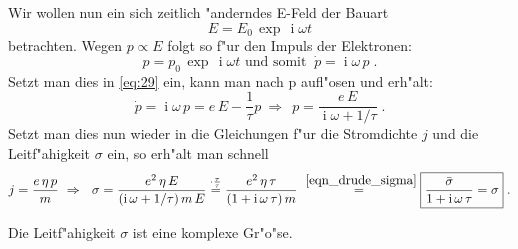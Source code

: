 \documentclass[twoside,a4paper]{book}
\newcommand{\diff}{\ensuremath{\, \mathrm{d}}}
\newcommand{\Folgt}{\ensuremath{~ \Rightarrow ~ ~ }}
\newcommand{\E}{\ensuremath{\operatorname{e}}}
\newcommand{\I}{\ensuremath{\operatorname{i}}}
\newcommand{\abs}[0]{\bigskip \noindent}
\begin{document}
\abs
Wir wollen nun ein sich zeitlich "anderndes E-Feld der Bauart
 $$E = E_0 \, \exp \, \I \omega t$$ 
betrachten. Wegen $p \propto E$ folgt so f"ur den Impuls der
Elektronen:
\begin{equation*}
   p = p_0 \, \exp \, \I \omega t \text{ und somit } ~ \dot p = \I
   \omega \, p \;.
\end{equation*}
Setzt man dies in \eqref{eq:29} ein, kann man nach p aufl"osen und
erh"alt:
\begin{equation}
\label{eq:33}
   \dot p = \I \omega \, p = e\, E - \frac{1}{\tau} p  \Folgt  p =
   \frac{e \, E}{\I \omega + 1/\tau} \;.
\end{equation}
Setzt man dies nun wieder in die Gleichungen f"ur die Stromdichte $j$
und die Leitf"ahigkeit $\sigma$ ein, so erh"alt man schnell
\begin{equation}
   \label{eq:32}
   j = \frac{e\, \eta\, p}{m} 
\Folgt 
\sigma = \frac{e^2 \, \eta\, E}{(\I \omega +
     1/\tau) \, m \, E} 
\stackrel{\text{$\cdot \frac{\tau}{\tau}$}}{=}
\frac{e^2 \, \eta \, \tau}{(1 + \I \omega \, \tau) \, m} 
\stackrel{~\eqref{eqn_drude_sigma}}{=}
\boxed{ \frac{\bar \sigma}{1 + \I \omega \, \tau} = \sigma } \;.
\end{equation}

\begin{Wichtig}
   Die Leitf"ahigkeit $\sigma$ ist eine komplexe Gr"o"se.
\end{Wichtig}
\end{document}
